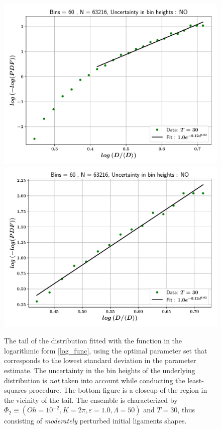 
\begin{figure}
\centering
\includegraphics{plots/drop_stats/log_tail_fit_uncertainty_no.pdf} \\
\includegraphics{plots/drop_stats/log_zoom_tail_fit_uncertainty_no.pdf} \\ 
\caption{
	The tail of the distribution fitted with the function 
	in the logarithmic form \eqref{log_func}, using the optimal parameter
	set that corresponds to the lowest standard deviation in the parameter estimate.
	The uncertainty in the bin heights of the underlying distribution is \textit{not}
	taken into account while conducting the least-squares procedure. 
	The bottom figure is a closeup of the region in the vicinity of the tail.
	The ensemble is characterized by $\Phi_2 \equiv \left( Oh = 10^{-2}, K = 2\pi 
	, \varepsilon = 1.0 , \Lambda = 50 \right)$ and $T = 30$, 
	thus consisting of \textit{moderately} perturbed initial ligaments shapes. 
	}
\label{log_fits_wo}
\end{figure}


